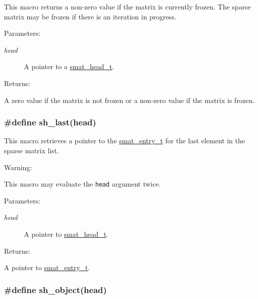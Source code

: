 This macro returns a non-zero value if the matrix is currently frozen. The sparse matrix may be frozen if there is an iteration in progress.\begin{Desc}
\item[Parameters: ]\par
\begin{description}
\item[{\em 
head}]A pointer to a \hyperlink{group__dbprim__smat_a1}{smat\_\-head\_\-t}.\end{description}
\end{Desc}
\begin{Desc}
\item[Returns: ]\par
A zero value if the matrix is not frozen or a non-zero value if the matrix is frozen. \end{Desc}
\hypertarget{group__dbprim__smat_a36}{
\subsubsection[sh\_\-last]{\setlength{\rightskip}{0pt plus 5cm}\#define sh\_\-last(head)}}
\label{group__dbprim__smat_a36}


This macro retrieves a pointer to the \hyperlink{group__dbprim__smat_a2}{smat\_\-entry\_\-t} for the last element in the sparse matrix list.

\begin{Desc}
\item[Warning: ]\par
This macro may evaluate the {\tt head} argument twice.\end{Desc}
\begin{Desc}
\item[Parameters: ]\par
\begin{description}
\item[{\em 
head}]A pointer to \hyperlink{group__dbprim__smat_a1}{smat\_\-head\_\-t}.\end{description}
\end{Desc}
\begin{Desc}
\item[Returns: ]\par
A pointer to \hyperlink{group__dbprim__smat_a2}{smat\_\-entry\_\-t}. \end{Desc}
\hypertarget{group__dbprim__smat_a37}{
\subsubsection[sh\_\-object]{\setlength{\rightskip}{0pt plus 5cm}\#define sh\_\-object(head)}}
\label{group__dbprim__smat_a37}



